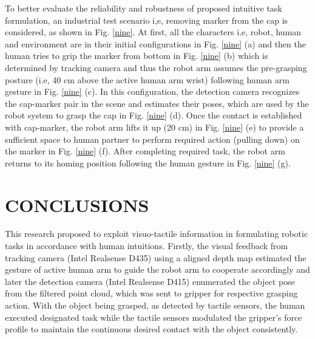 \documentclass[letterpaper, 10 pt, conference]{ieeeconf}  %
\begin{document}
To better evaluate the reliability and robustness of proposed intuitive task formulation, an industrial test scenario i,e, removing marker from the cap is considered, as shown in Fig. \ref{nine}. At first, all the characters i.e, robot, human and environment are in their initial configurations in Fig. \ref{nine} (a) and then the human tries to grip the marker from bottom in Fig. \ref{nine} (b) which is determined by tracking camera and thus the robot arm assumes the pre-grasping posture (i.e, 40 cm above the active human arm wrist) following human arm gesture in Fig. \ref{nine} (c). In this configuration, the detection camera recognizes the cap-marker pair in the scene and estimates their poses, which are used by the robot system to grasp the cap in Fig. \ref{nine} (d). Once the contact is established with cap-marker, the robot arm lifts it up (20 cm) in Fig. \ref{nine} (e) to provide a sufficient space to human partner to perform required action (pulling down) on the marker in Fig. \ref{nine} (f). After completing required task, the robot arm returns to its homing position following the human gesture in Fig. \ref{nine} (g).        


\section{CONCLUSIONS}

This research proposed to exploit visuo-tactile information in formulating robotic tasks in accordance with human intuitions. Firstly, the visual feedback from tracking camera (Intel Realsense D435) using a aligned depth map estimated the gesture of active human arm to guide the robot arm to cooperate accordingly and later the detection camera (Intel Realsense D415) enumerated the object pose from the filtered point cloud, which was sent to gripper for respective grasping action. With the object being grasped, as detected by tactile sensors, the human executed designated task while the tactile sensors modulated the gripper's force profile to maintain the continuous desired contact with the object consistently.
\end{document}
